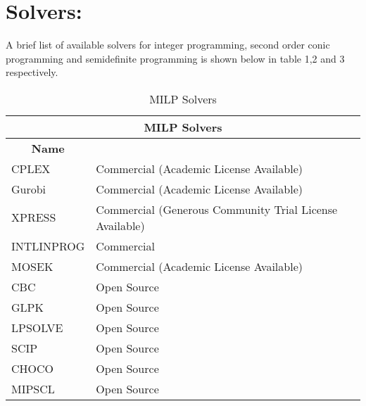  \newpage
 \section{Solvers:}
A brief list of available solvers for integer programming, second order conic programming and semidefinite programming is shown below in table 1,2 and 3 respectively. 

\begin{longtable}{|l|l|}
    \caption{MILP Solvers}
    \label{tab:MILP Solvers}\\
    \hline
\multicolumn{2}{|c|}{\textbf{MILP Solvers}}                                                   \\ \hline
\endfirsthead
%
\endhead
%
\multicolumn{1}{|c|}{\textbf{Name}} &                                                         \\ \hline
CPLEX                               & Commercial (Academic License Available)                 \\ \hline
Gurobi                              & Commercial (Academic License Available)                 \\ \hline
XPRESS                              & Commercial (Generous Community Trial License Available) \\ \hline
INTLINPROG                          & Commercial                                              \\ \hline
MOSEK                               & Commercial (Academic License Available)                 \\ \hline
CBC                                 & Open Source                                             \\ \hline
GLPK                                & Open Source                                             \\ \hline
LPSOLVE                             & Open Source                                             \\ \hline
SCIP                                & Open Source                                             \\ \hline
CHOCO                               & Open Source                                             \\ \hline
MIPSCL                              & Open Source                                             \\ \hline
\end{longtable}




